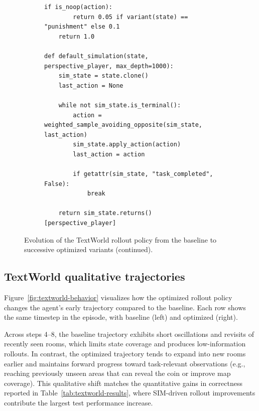 \documentclass{article}
\begin{document}
\begin{figure}[p]
\begin{subfigure}[t]{0.98\textwidth}
\begin{lstlisting}[basicstyle=\ttfamily\scriptsize]
    if is_noop(action):
        return 0.05 if variant(state) == "punishment" else 0.1
    return 1.0

def default_simulation(state, perspective_player, max_depth=1000):
    sim_state = state.clone()
    last_action = None

    while not sim_state.is_terminal():
        action = weighted_sample_avoiding_opposite(sim_state, last_action)
        sim_state.apply_action(action)
        last_action = action

        if getattr(sim_state, "task_completed", False):
            break

    return sim_state.returns()[perspective_player]
\end{lstlisting}
  \end{subfigure}

  \caption[]{Evolution of the TextWorld rollout policy from the baseline to successive optimized variants (continued).}
\end{figure}

\subsection{TextWorld qualitative trajectories}
\label{app:textworld_qualitative}
\noindent Figure~\ref{fig:textworld-behavior} visualizes how the optimized rollout policy changes the agent's early trajectory compared to the baseline. Each row shows the same timestep in the episode, with baseline (left) and optimized (right).

\noindent Across steps 4--8, the baseline trajectory exhibits short oscillations and revisits of recently seen rooms, which limits state coverage and produces low-information rollouts. In contrast, the optimized trajectory tends to expand into new rooms earlier and maintains forward progress toward task-relevant observations (e.g., reaching previously unseen areas that can reveal the coin or improve map coverage). This qualitative shift matches the quantitative gains in correctness reported in Table~\ref{tab:textworld-results}, where SIM-driven rollout improvements contribute the largest test performance increase.
\end{document}
